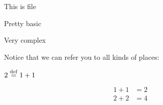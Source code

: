\documentclass{ximera}
\begin{document}
    \author{Wim Obbels}
    \label{xim:references}


This is file \currfilename

\label{sec:basicdefinition}

\begin{definition}\label{def:basicdefinition}
Pretty basic
\end{definition}

\label{sec:advanceddefinition}

\begin{definition}\label{def:advanceddefinition}
Very complex
\end{definition}


\label{sec:hyperlinks}

Notice that we can refer you to all kinds of places: 
\begin{definition}\label{def:def1} $2 \overset{\mathrm{def}}{=} 1+1$
\end{definition}	

\begin{align}
 1 + 1 & = 2 \label{links_test1} \\
 2 + 2 & = 4 \label{links_test2}
\end{align}
\end{document}
